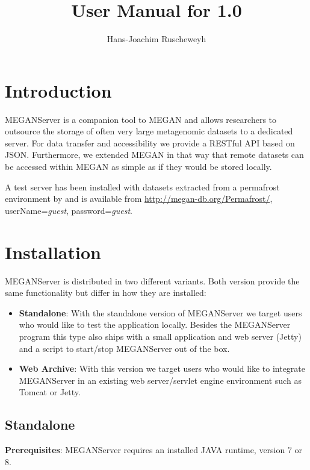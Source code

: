 \documentclass[11pt]{article}
\title{User Manual for \sf{MEGANServer}1.0}
\author{Hans-Joachim Ruscheweyh}
\begin{document}

\maketitle


{\small
\setcounter{tocdepth}{3}
\tableofcontents
}
\clearpage
\section{Introduction}


MEGANServer is a companion tool to MEGAN \citep{MEGAN2011} and allows researchers to outsource the storage of often very large metagenomic datasets to a dedicated server. For data transfer and accessibility we provide a RESTful API based on JSON. Furthermore, we extended MEGAN in that way that remote datasets can be accessed within MEGAN as simple as if they would be stored locally.

A test server has been installed with datasets extracted from a permafrost environment by \citep{Mackelprang2011}  and is available from \url{http://megan-db.org/Permafrost/}, userName=\textit{guest}, password=\textit{guest}.


\section{Installation}

MEGANServer is distributed in two different variants. Both version provide the same functionality but differ in how they are installed:

\begin{itemize}
\item \textbf{Standalone}: With the standalone version of MEGANServer we target users who would like to test the application locally. Besides the MEGANServer program this type also ships with a small application and web server (Jetty) and a script to start/stop MEGANServer out of the box.
\item \textbf{Web Archive}: With this version we target users who would like to integrate MEGANServer in an existing web server/servlet engine environment such as Tomcat or Jetty.
\end{itemize}

\subsection{Standalone}
\textbf{Prerequisites}: MEGANServer requires an installed JAVA runtime, version 7 or 8.
\end{document}

